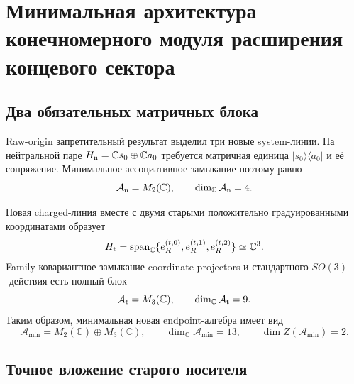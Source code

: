 \chapter{Минимальная архитектура конечномерного модуля расширения концевого сектора}
\label{ch:v9-endpoint-finite-module}

\section{Два обязательных матричных блока}

Raw-origin запретительный результат выделил три новые system-линии. На нейтральной паре
$H_{\rm n}=\mathbb Cs_0\oplus\mathbb Ca_0$ требуется матричная единица
$|s_0\rangle\langle a_0|$ и её сопряжение. Минимальное ассоциативное
замыкание поэтому равно
\begin{equation}
 \mathcal A_{\rm n}=M_2(\mathbb C),
 \qquad \dim_{\mathbb C}\mathcal A_{\rm n}=4.
 \label{eq:v9-finite-module-neutral-algebra}
\end{equation}

Новая charged-линия вместе с двумя старыми положительно градуированными
координатами образует
\begin{equation}
 H_{\rm t}=\operatorname{span}_{\mathbb C}
 \{e_R^{(t,0)},e_R^{(t,1)},e_R^{(t,2)}\}\simeq\mathbb C^3.
 \label{eq:v9-finite-module-triplet}
\end{equation}
Family-ковариантное замыкание coordinate projectors и стандартного
$SO(3)$-действия есть полный блок
\begin{equation}
 \mathcal A_{\rm t}=M_3(\mathbb C),
 \qquad \dim_{\mathbb C}\mathcal A_{\rm t}=9.
 \label{eq:v9-finite-module-triplet-algebra}
\end{equation}
Таким образом, минимальная новая endpoint-алгебра имеет вид
\begin{equation}
 \mathcal A_{\min}=M_2(\mathbb C)\oplus M_3(\mathbb C),
 \qquad \dim_{\mathbb C}\mathcal A_{\min}=13,
 \qquad \dim Z(\mathcal A_{\min})=2.
 \label{eq:v9-finite-module-minimal-algebra}
\end{equation}

\section{Точное вложение старого носителя}

